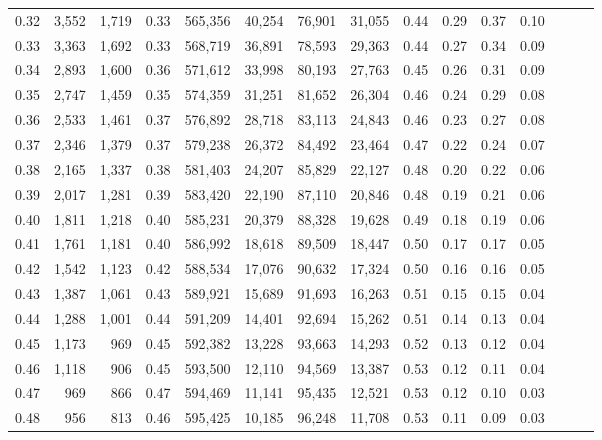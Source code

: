 \begin{tabular}{rrrrrrrrrrrrrrr}
0.32 &   3,552 &  1,719 &  0.33 &  565,356 &   40,254 &   76,901 &   31,055 &  0.44 &  0.29 &  0.37 &      0.10 \\
0.33 &   3,363 &  1,692 &  0.33 &  568,719 &   36,891 &   78,593 &   29,363 &  0.44 &  0.27 &  0.34 &      0.09 \\
0.34 &   2,893 &  1,600 &  0.36 &  571,612 &   33,998 &   80,193 &   27,763 &  0.45 &  0.26 &  0.31 &      0.09 \\
0.35 &   2,747 &  1,459 &  0.35 &  574,359 &   31,251 &   81,652 &   26,304 &  0.46 &  0.24 &  0.29 &      0.08 \\
0.36 &   2,533 &  1,461 &  0.37 &  576,892 &   28,718 &   83,113 &   24,843 &  0.46 &  0.23 &  0.27 &      0.08 \\
0.37 &   2,346 &  1,379 &  0.37 &  579,238 &   26,372 &   84,492 &   23,464 &  0.47 &  0.22 &  0.24 &      0.07 \\
0.38 &   2,165 &  1,337 &  0.38 &  581,403 &   24,207 &   85,829 &   22,127 &  0.48 &  0.20 &  0.22 &      0.06 \\
0.39 &   2,017 &  1,281 &  0.39 &  583,420 &   22,190 &   87,110 &   20,846 &  0.48 &  0.19 &  0.21 &      0.06 \\
0.40 &   1,811 &  1,218 &  0.40 &  585,231 &   20,379 &   88,328 &   19,628 &  0.49 &  0.18 &  0.19 &      0.06 \\
0.41 &   1,761 &  1,181 &  0.40 &  586,992 &   18,618 &   89,509 &   18,447 &  0.50 &  0.17 &  0.17 &      0.05 \\
0.42 &   1,542 &  1,123 &  0.42 &  588,534 &   17,076 &   90,632 &   17,324 &  0.50 &  0.16 &  0.16 &      0.05 \\
0.43 &   1,387 &  1,061 &  0.43 &  589,921 &   15,689 &   91,693 &   16,263 &  0.51 &  0.15 &  0.15 &      0.04 \\
0.44 &   1,288 &  1,001 &  0.44 &  591,209 &   14,401 &   92,694 &   15,262 &  0.51 &  0.14 &  0.13 &      0.04 \\
0.45 &   1,173 &    969 &  0.45 &  592,382 &   13,228 &   93,663 &   14,293 &  0.52 &  0.13 &  0.12 &      0.04 \\
0.46 &   1,118 &    906 &  0.45 &  593,500 &   12,110 &   94,569 &   13,387 &  0.53 &  0.12 &  0.11 &      0.04 \\
0.47 &     969 &    866 &  0.47 &  594,469 &   11,141 &   95,435 &   12,521 &  0.53 &  0.12 &  0.10 &      0.03 \\
0.48 &     956 &    813 &  0.46 &  595,425 &   10,185 &   96,248 &   11,708 &  0.53 &  0.11 &  0.09 &      0.03 \\

\end{tabular}
